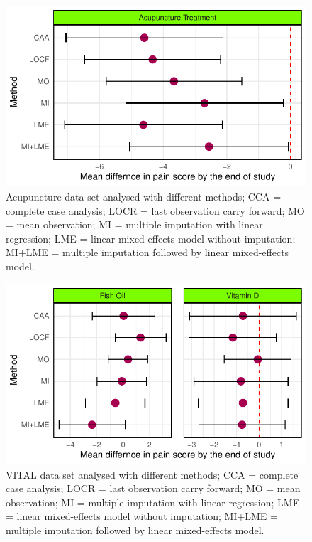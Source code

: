 \documentclass{article}
\newcommand{\pandocbounded}[1]{#1}
\begin{document}
\begin{figure}
\centering
\pandocbounded{\includegraphics[keepaspectratio]{Final_Report_files/figure-latex/unnamed-chunk-34-1.pdf}}
\caption{Acupuncture data set analysed with different methods; CCA =
complete case analysis; LOCR = last observation carry forward; MO = mean
observation; MI = multiple imputation with linear regression; LME =
linear mixed-effects model without imputation; MI+LME = multiple
imputation followed by linear mixed-effects model.}
\end{figure}

\begin{figure}
\centering
\pandocbounded{\includegraphics[keepaspectratio]{Final_Report_files/figure-latex/unnamed-chunk-35-1.pdf}}
\caption{VITAL data set analysed with different methods; CCA = complete
case analysis; LOCR = last observation carry forward; MO = mean
observation; MI = multiple imputation with linear regression; LME =
linear mixed-effects model without imputation; MI+LME = multiple
imputation followed by linear mixed-effects model.}
\end{figure}
\end{document}
